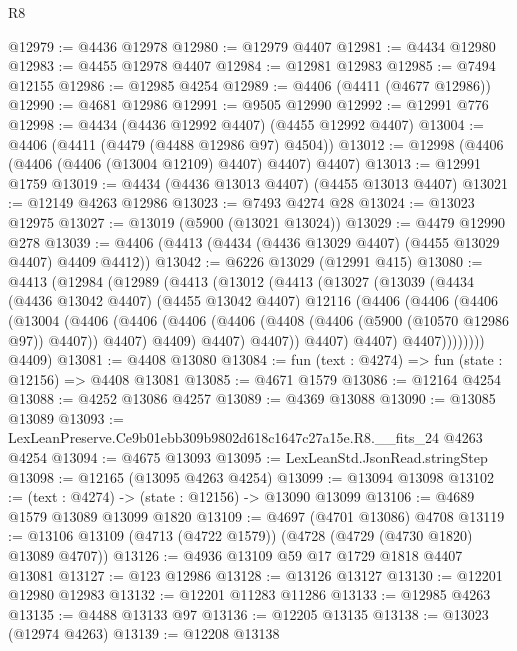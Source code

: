 \begin{lexlean}{R8}
\begin{coremodule}
@12979 := @4436 @12978
@12980 := @12979 @4407
@12981 := @4434 @12980
@12983 := @4455 @12978 @4407
@12984 := @12981 @12983
@12985 := @7494 @12155
@12986 := @12985 @4254
@12989 := @4406 (@4411 (@4677 @12986))
@12990 := @4681 @12986
@12991 := @9505 @12990
@12992 := @12991 @776
@12998 := @4434 (@4436 @12992 @4407) (@4455 @12992 @4407)
@13004 := @4406 (@4411 (@4479 (@4488 @12986 @97) @4504))
@13012 := @12998 (@4406 (@4406 (@4406 (@13004 @12109) @4407) @4407) @4407)
@13013 := @12991 @1759
@13019 := @4434 (@4436 @13013 @4407) (@4455 @13013 @4407)
@13021 := @12149 @4263 @12986
@13023 := @7493 @4274 @28
@13024 := @13023 @12975
@13027 := @13019 (@5900 (@13021 @13024))
@13029 := @4479 @12990 @278
@13039 := @4406 (@4413 (@4434 (@4436 @13029 @4407) (@4455 @13029 @4407) @4409 @4412))
@13042 := @6226 @13029 (@12991 @415)
@13080 := @4413
    (@12984
      (@12989
        (@4413
          (@13012
            (@4413
              (@13027
                (@13039
                  (@4434
                    (@4436 @13042 @4407)
                    (@4455 @13042 @4407)
                    @12116
                    (@4406
                      (@4406
                        (@4406
                          (@13004
                            (@4406
                              (@4406
                                (@4406
                                  (@4406 (@4408 (@4406 (@5900 (@10570 @12986 @97)) @4407)) @4407)
                                  @4409)
                                @4407)
                              @4407))
                          @4407)
                        @4407)
                      @4407))))))))
      @4409)
@13081 := @4408 @13080
@13084 := fun (text : @4274) => fun (state : @12156) => @4408 @13081
@13085 := @4671 @1579
@13086 := @12164 @4254
@13088 := @4252 @13086 @4257
@13089 := @4369 @13088
@13090 := @13085 @13089
@13093 := LexLeanPreserve.Ce9b01ebb309b9802d618c1647c27a15e.R8.__fits_24 @4263 @4254
@13094 := @4675 @13093
@13095 := LexLeanStd.JsonRead.stringStep
@13098 := @12165 (@13095 @4263 @4254)
@13099 := @13094 @13098
@13102 := (text : @4274) -> (state : @12156) -> @13090 @13099
@13106 := @4689 @1579 @13089 @13099 @1820
@13109 := @4697 (@4701 @13086) @4708
@13119 := @13106 @13109 (@4713 (@4722 @1579)) (@4728 (@4729 (@4730 @1820) @13089 @4707))
@13126 := @4936 @13109 @59 @17 @1729 @1818 @4407 @13081
@13127 := @123 @12986
@13128 := @13126 @13127
@13130 := @12201 @12980 @12983
@13132 := @12201 @11283 @11286
@13133 := @12985 @4263
@13135 := @4488 @13133 @97
@13136 := @12205 @13135
@13138 := @13023 (@12974 @4263)
@13139 := @12208 @13138

\end{coremodule}
\end{lexlean}
